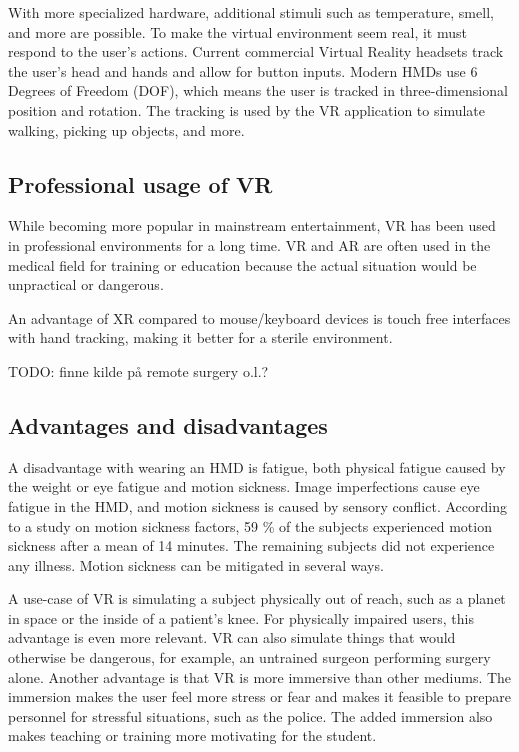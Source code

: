 \documentclass[a4paper]{report}
\begin{document}
With more specialized hardware, additional stimuli such as temperature, smell, and more are possible\cite{noauthor_feelreal_nodate}.
To make the virtual environment seem real, it must respond to the user's actions. Current commercial Virtual Reality headsets track the user's head and hands and allow for button inputs\cite{noauthor_oculus_nodate}. Modern HMDs use 6 Degrees of Freedom (DOF), which means the user is tracked in three-dimensional position and rotation\cite{lang_introduction_2013}. The tracking is used by the VR application to simulate walking, picking up objects, and more.

\subsection{Professional usage of VR}
While becoming more popular in mainstream entertainment, VR has been used in professional environments for a long time\cite{needed}. VR and AR are often used in the medical field for training or education because the actual situation would be unpractical or dangerous\cite{freina_immersive_2015}.

An advantage of XR compared to mouse/keyboard devices is touch free interfaces with hand tracking, making it better for a sterile environment\cite{andrews}.

TODO: finne kilde på remote surgery o.l.?

\subsection{Advantages and disadvantages}
A disadvantage with wearing an HMD is fatigue, both physical fatigue caused by the weight or eye fatigue and motion sickness\cite{merhi_motion_2007}.
Image imperfections cause eye fatigue in the HMD\cite{kooi_visual_2004}, and motion sickness is caused by sensory conflict.
According to a study on motion sickness factors, 59 \% of the subjects experienced motion sickness after a mean of 14 minutes. The remaining subjects did not experience any illness\cite{kooi_visual_2004}. Motion sickness can be mitigated in several ways.


A use-case of VR is simulating a subject physically out of reach, such as a planet in space or the inside of a patient's knee. For physically impaired users, this advantage is even more relevant.
VR can also simulate things that would otherwise be dangerous, for example, an untrained surgeon performing surgery alone.
Another advantage is that VR is more immersive than other mediums. The immersion makes the user feel more stress or fear and makes it feasible to prepare personnel for stressful situations, such as the police.
The added immersion also makes teaching or training more motivating for the student.\cite{freina_immersive_2015}
\end{document}
